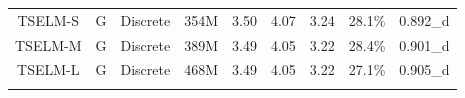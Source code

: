 \documentclass[conference]{IEEEtran}
\begin{document}
\begin{table}
\begin{center}
\begin{tabular}{ccccccccc}
            \hline
            TSELM-S           & G       & Discrete                    & 354M                        & 3.50    & 4.07    & 3.24   & 28.1\%                & 0.892\_d                 \\
            TSELM-M          & G        & Discrete                    & 389M                        & 3.49    & 4.05    & 3.22   & 28.4\%                & 0.901\_d                 \\
            TSELM-L         & G         & Discrete                    & 468M                        & 3.49    & 4.05    & 3.22   & 27.1\%                & 0.905\_d \\
            \Xhline{2\arrayrulewidth} %
            \end{tabular}
            \linebreak
            \label{main_exp}
      \end{center}
  \end{table}
\end{document}
